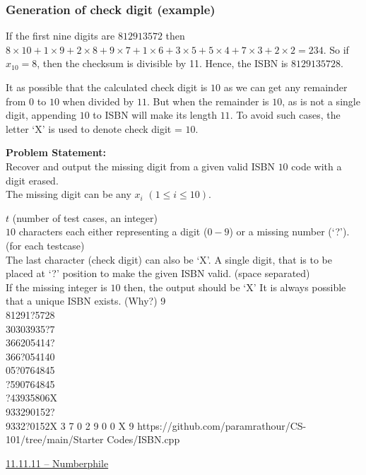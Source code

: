 \documentclass[../../Problems]{subfiles}
\begin{document}
\subsubsection*{Generation of check digit (example)}
If the first nine digits are $812913572$ then $8\times10 + 1\times9 + 2\times8 + 9\times7 + 1\times6 + 3\times5 + 5\times4 + 7\times3 + 2\times2 = 234$. So if $x_{10} = 8$, then the checksum is divisible by 11. Hence, the ISBN is $8129135728$.
\begin{note}
It as possible that the calculated check digit is $10$ as we can get any remainder from $0$ to $10$ when divided by $11$. But when the remainder is $10$, as is not a single digit, appending $10$ to ISBN will make its length $11$. To avoid such cases, the letter `X' is used to denote check digit = $10$.
\end{note}
\textbf{Problem Statement:}\\
Recover and output the missing digit from a given valid ISBN $10$ code with a digit erased.\\
The missing digit can be any $x_i$ $(1\leq i\leq 10)$.
\begin{testcases}
	{$t$ \hfill(number of test cases, an integer)\\
	$10$ characters each either representing a digit ($0-9$) or a missing number (`?').\hfill(for each testcase)\\
	The last character (check digit) can also be `X'.}
	{A single digit, that is to be placed at `?' position to make the given ISBN valid.
 \hfill{(space separated)}\\
	If the missing integer is $10$ then, the output should be `X'}
	{It is always possible that a unique ISBN exists. (Why?)}
	{9\\81291?5728\\30303935?7\\366205414?\\366?054140\\05?0764845\\?590764845\\?43935806X\\933290152?\\9332?0152X}
	{3 7 0 2 9 0 0 X 9}
	{https://github.com/paramrathour/CS-101/tree/main/Starter Codes/ISBN.cpp}
\end{testcases}
\begin{funvideo}
\href{https://youtu.be/sPFWfAxIiwg}{11.11.11 -- Numberphile}
\end{funvideo}
\end{document}
